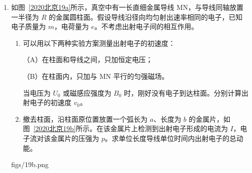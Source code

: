 \documentclass[\gkver]{gaokaozhenti}
\begin{document}
\begin{enumerate}
{（2）根据法拉第电磁感应定律有 $E=N\frac{\Delta\Phi}{\Delta t}=200\times\frac{0.015-0.010}{0.10}\UV=10\UV$。

（3）电阻 $R$ 两端的电压为路端电压，根据分压规律可知 $U=\frac{R}{R+r}E=\frac{48}{48+2}\times10\UV=9.6\UV$。
}

\item
如图~\ref{2020北京19a}所示，真空中有一长直细金属导线 MN，与导线同轴放置一半径为 $R$ 的金属圆柱面。假设导线沿径向均匀射出速率相同的电子，已知电子质量为 $m$，电荷量为 $e$。不考虑出射电子间的相互作用。

\begin{enumerate}
	\item
	可以用以下两种实验方案测量出射电子的初速度：
	
	（A）在柱面和导线之间，只加恒定电压；
	
	（B）在柱面内，只加与 MN 平行的匀强磁场。
	
	当电压为 $U_{0}$ 或磁感应强度为 $B_{0}$ 时，刚好没有电子到达柱面。分别计算出射电子的初速度 $v_{0}$。
	\item
	撤去柱面，沿柱面原位置放置一个弧长为 $a$、长度为 $b$ 的金属片，如图~\ref{2020北京19b}所示。在该金属片上检测到出射电子形成的电流为 $I$，电子流对该金属片的压强为 $p$。求单位长度导线单位时间内出射电子的总动能。
\end{enumerate}

{figs/19b.png}

\end{enumerate}
\end{document}
